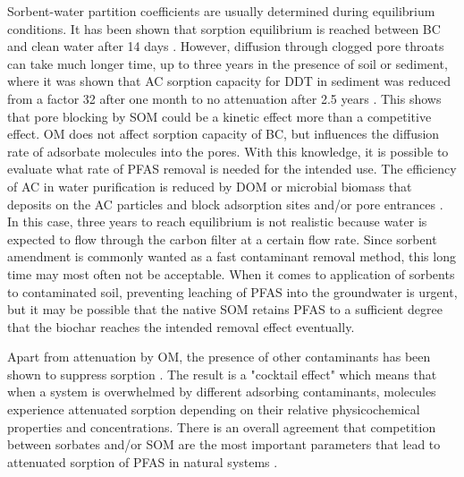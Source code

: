 Sorbent-water partition coefficients are usually determined during equilibrium conditions. It has been shown that sorption equilibrium is reached between BC and clean water after 14 days \citep{Kupryianchyk2016b}. However, diffusion through clogged pore throats can take much longer time, up to three years in the presence of soil or sediment, where it was shown that AC sorption capacity for DDT in sediment was reduced from a factor 32 after one month to no attenuation after 2.5 years \citep{hale2009sorption}. This shows that pore blocking by SOM could be a kinetic effect more than a competitive effect. OM does not affect sorption capacity of BC, but influences the diffusion rate of adsorbate molecules into the pores. With this knowledge, it is possible to evaluate what rate of PFAS removal is needed for the intended use. The efficiency of AC in water purification is reduced by DOM or microbial biomass that deposits on the AC particles and block adsorption sites and/or pore entrances \citep{Teixido2013}. In this case, three years to reach equilibrium is not realistic because water is expected to flow through the carbon filter at a certain flow rate. Since sorbent amendment is commonly wanted as a fast contaminant removal method, this long time may most often not be acceptable. When it comes to application of sorbents to contaminated soil, preventing leaching of PFAS into the groundwater is urgent, but it may be possible that the native SOM retains PFAS to a sufficient degree that the biochar reaches the intended removal effect eventually. 

Apart from attenuation by OM, the presence of other contaminants has been shown to suppress sorption \citep{Cornelissen2006}.
The result is a "cocktail effect" which means that when a system is overwhelmed by different adsorbing contaminants, molecules experience attenuated sorption depending on their relative physicochemical properties and concentrations. There is an overall agreement that competition between sorbates and/or SOM are the most important parameters that lead to attenuated sorption of PFAS in natural systems \citep{zareitalabad2013perfluorooctanoic,higgins2006sorption,Teixido2013}. 